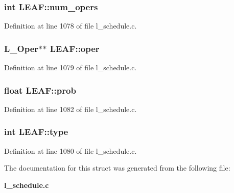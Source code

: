 \subsubsection{\setlength{\rightskip}{0pt plus 5cm}int \bf{LEAF::num\_\-opers}}\label{structLEAF_a227154d61cb43f06f004a8c5a9cfe11}




Definition at line 1078 of file l\_\-schedule.c.
\subsubsection{\setlength{\rightskip}{0pt plus 5cm}L\_\-Oper$\ast$$\ast$ \bf{LEAF::oper}}\label{structLEAF_a92c57bab2c8642ba0cd4c2ef3cf9fad}




Definition at line 1079 of file l\_\-schedule.c.
\subsubsection{\setlength{\rightskip}{0pt plus 5cm}float \bf{LEAF::prob}}\label{structLEAF_d74aefd20b25b0d95f0d2178b7290e0a}




Definition at line 1082 of file l\_\-schedule.c.
\subsubsection{\setlength{\rightskip}{0pt plus 5cm}int \bf{LEAF::type}}\label{structLEAF_63c34c3b06e18a0e85c8ee103ae89540}




Definition at line 1080 of file l\_\-schedule.c.

The documentation for this struct was generated from the following file:\begin{CompactItemize}
\item 
\bf{l\_\-schedule.c}\end{CompactItemize}
